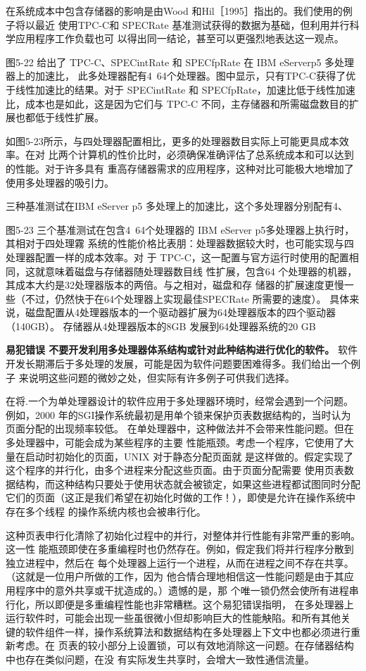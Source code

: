 在系统成本中包含存储器的影响是由Wood 和Hil［1995］指出的。我们使用的例子将以最近
使用TPC-C和 SPECRate 基准测试获得的数据为基础，但利用并行科学应用程序工作负载也可
以得出同一结论，甚至可以更强烈地表达这一观点。

图5-22 给出了 TPC-C、SPECintRate 和 SPECfpRate 在 IBM eServerp5 多处理器上的加速比，
此多处理器配有4~64个处理器。图中显示，只有TPC-C获得了优于线性加速比的结果。对于
SPECintRate 和 SPECfpRate，加速比低于线性加速比，成本也是如此，这是因为它们与 TPC-C
不同，主存储器和所需磁盘数目的扩展也都低于线性扩展。

如图5-23所示，与四处理器配置相比，更多的处理器数目实际上可能更具成本效率。在对
比两个计算机的性价比时，必须确保准确评估了总系统成本和可以达到的性能。对于许多具有
重高存储器需求的应用程序，这种对比可能极大地增加了使用多处理器的吸引力。

三种基准测试在IBM eServer p5 多处理上的加速比，这个多处理器分别配有4、

图5-23 三个基准测试在包含4~64个处理器的 IBM eServer p5多处理器上执行时，其相对于四处理霧
系统的性能价格比表朋：处理器数据较大时，也可能实现与四处理器配置一样的成本效率。对
于 TPC-C，这一配置与官方运行时使用的配置相同，这就意味着磁盘与存储器随处理器数目线
性扩展，包含64 个处理器的机器，其成本大约是32处理器版本的两倍。与之相对，磁盘和存
储器的扩展速度更慢一些（不过，仍然快于在64个处理器上实现最佳SPECRate 所需要的速度）。
具体来说，磁盘配置从4处理器版本的一个驱动器扩展为64处理器版本的四个驱动器（140GB）。
存储器从4处理器版本的8GB 发展到64处理器系统的20 GB

\textbf{易犯错误 不要开发利用多处理器体系结构或针对此种结构进行优化的软件。}
软件开发长期滞后于多处理的发展，可能是因为软件问题要困难得多。我们给出一个例子
来说明这些问题的微妙之处，但实际有许多例子可供我们选择。

在将.一个为单处理器设计的软件应用于多处理器环境时，经常会遇到一个问题。例如，2000
年的SGI操作系统最初是用单个锁来保护页表数据结构的，当时认为页面分配的出现频率较低。
在单处理器中，这种做法并不会带来性能问题。但在多处理器中，可能会成为某些程序的主要
性能瓶颈。考虑一个程序，它使用了大量在启动时初始化的页面，UNIX 对于静态分配页面就
是这样做的。假定实现了这个程序的并行化，由多个进程来分配这些页面。由于页面分配需要
使用页表数据结构，而这种结构只要处于使用状态就会被锁定，如果这些进程都试图同时分配
它们的页面（这正是我们希望在初始化时做的工作！），即使是允许在操作系统中存在多个线程
的操作系统内核也会被串行化。

这种页表申行化清除了初始化过程中的并行，对整体并行性能有非常严重的影响。这一性
能瓶颈即使在多重编程时也仍然存在。例如，假定我们将并行程序分散到独立进程中，然后在
每个处理器上运行一个进程，从而在进程之间不存在共享。（这就是一位用户所做的工作，因为
他合情合理地相信这一性能问题是由于其应用程序中的意外共享或干扰造成的。）遗憾的是，那
个唯一锁仍然会使所有进程串行化，所以即便是多重编程性能也非常糟糕。这个易犯错误指明，
在多处理器上运行软件时，可能会出现一些虽很微小但却影响巨大的性能觖陷。和所有其他关
键的软件组件一样，操作系统算法和数据结构在多处理器上下文中也都必须进行重新考虑。在
页表的较小部分上设置锁，可以有效地消除这一问题。在存储器结构中也存在类似问题，在没
有实际发生共享时，会增大一致性通信流量。

